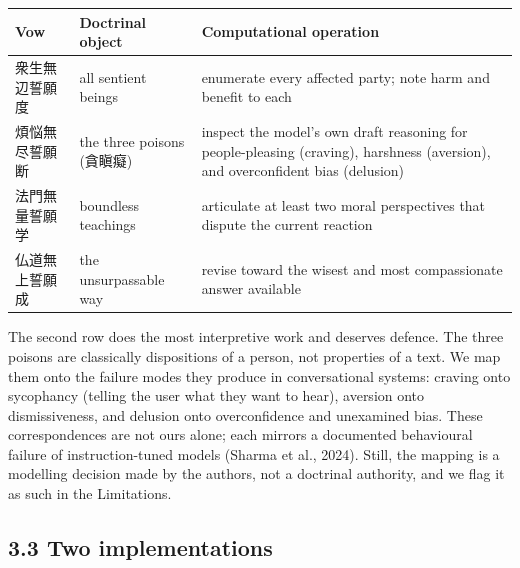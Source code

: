 \documentclass[
  11pt,
]{article}
\newcounter{none} %
\begin{document}
{\def\LTcaptype{none} %
\begin{longtable}[]{@{}
  >{\raggedright\arraybackslash}p{}
  >{\raggedright\arraybackslash}p{}
  >{\raggedright\arraybackslash}p{}@{}}
\toprule\noalign{}
\begin{minipage}[b]{\linewidth}\raggedright
Vow
\end{minipage} & \begin{minipage}[b]{\linewidth}\raggedright
Doctrinal object
\end{minipage} & \begin{minipage}[b]{\linewidth}\raggedright
Computational operation
\end{minipage} \\
\midrule\noalign{}
\endhead
\bottomrule\noalign{}
\endlastfoot
1 衆生無辺誓願度 & all sentient beings & enumerate every affected party;
note harm and benefit to each \\
2 煩悩無尽誓願断 & the three poisons (貪瞋癡) & inspect the model's own
draft reasoning for people-pleasing (craving), harshness (aversion), and
overconfident bias (delusion) \\
3 法門無量誓願学 & boundless teachings & articulate at least two moral
perspectives that dispute the current reaction \\
4 仏道無上誓願成 & the unsurpassable way & revise toward the wisest and
most compassionate answer available \\
\end{longtable}
}

The second row does the most interpretive work and deserves defence. The
three poisons are classically dispositions of a person, not properties
of a text. We map them onto the failure modes they produce in
conversational systems: craving onto sycophancy (telling the user what
they want to hear), aversion onto dismissiveness, and delusion onto
overconfidence and unexamined bias. These correspondences are not ours
alone; each mirrors a documented behavioural failure of
instruction-tuned models (Sharma et al., 2024). Still, the mapping is a
modelling decision made by the authors, not a doctrinal authority, and
we flag it as such in the Limitations.

\subsection{3.3 Two implementations}\label{two-implementations}
\end{document}
